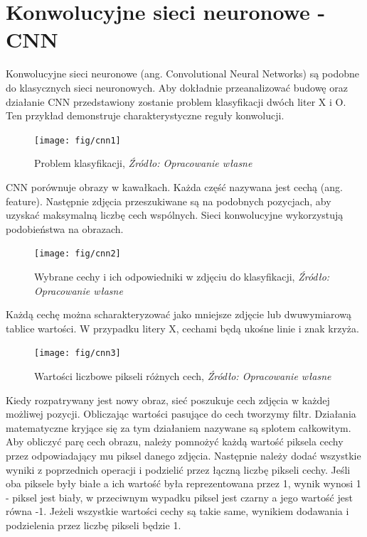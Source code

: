 \documentclass[brudnopis]{xmgr}
\begin{document}
\newpage

\section{Konwolucyjne sieci neuronowe - CNN}

Konwolucyjne sieci neuronowe (ang. Convolutional Neural Networks)\cite{14} są podobne do klasycznych sieci neuronowych. Aby dokładnie przeanalizować budowę oraz działanie CNN przedstawiony zostanie problem klasyfikacji dwóch liter X i O. Ten przykład demonstruje charakterystyczne reguły konwolucji.

\begin{figure}[!tbh]
\centering
\texttt{[image: fig/cnn1]}
\caption{Problem klasyfikacji, \emph{Źródło: Opracowanie własne}}
\end{figure}

CNN porównuje obrazy w kawałkach. Każda część nazywana jest cechą (ang. feature). Następnie zdjęcia przeszukiwane są na podobnych pozycjach, aby uzyskać maksymalną liczbę cech wspólnych. Sieci konwolucyjne wykorzystują podobieństwa na obrazach.

\begin{figure}[!tbh]
\centering
\texttt{[image: fig/cnn2]}
\caption{Wybrane cechy i ich odpowiedniki w zdjęciu do klasyfikacji, \emph{Źródło: Opracowanie własne}}
\end{figure}
\newpage

Każdą cechę można scharakteryzować jako mniejsze zdjęcie lub dwuwymiarową tablice wartości. W przypadku litery X, cechami będą ukośne linie i znak krzyża.

\begin{figure}[!tbh]
\centering
\texttt{[image: fig/cnn3]}
\caption{Wartości liczbowe pikseli różnych cech, \emph{Źródło: Opracowanie własne}}
\end{figure}

Kiedy rozpatrywany jest nowy obraz, sieć poszukuje cech zdjęcia w każdej możliwej pozycji. Obliczając wartości pasujące do cech tworzymy filtr. Działania matematyczne kryjące się za tym działaniem nazywane są splotem całkowitym. Aby obliczyć parę cech obrazu, należy pomnożyć każdą wartość piksela cechy przez odpowiadający mu piksel danego zdjęcia. Następnie należy dodać wszystkie wyniki z poprzednich operacji i podzielić przez łączną liczbę pikseli cechy. Jeśli oba piksele były białe a ich wartość była reprezentowana przez 1, wynik wynosi 1 - piksel jest biały, w przeciwnym wypadku piksel jest czarny a jego wartość jest równa -1. Jeżeli wszystkie wartości cechy są takie same, wynikiem dodawania i podzielenia przez liczbę pikseli będzie 1.
\newpage
\end{document}
